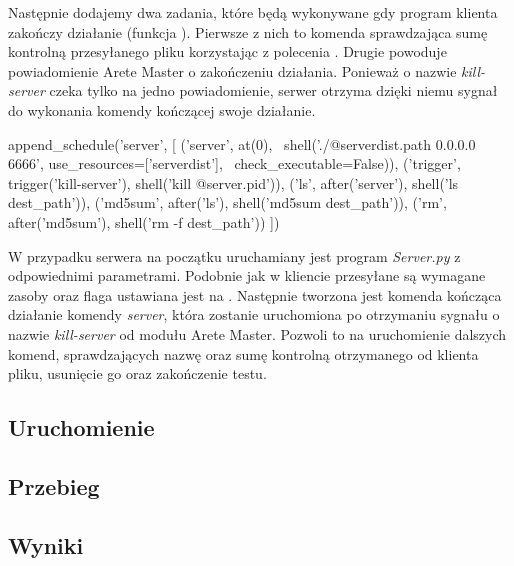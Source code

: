 \documentclass[00-praca-magisterska.tex]{subfiles}
\begin{document}
Następnie dodajemy dwa zadania, które będą wykonywane gdy program klienta zakończy
działanie (funkcja ). Pierwsze z nich to komenda sprawdzająca sumę
kontrolną przesyłanego pliku korzystając z polecenia . Drugie
powoduje powiadomienie Arete Master o zakończeniu działania. Ponieważ
 o nazwie \emph{kill-server} czeka tylko na jedno powiadomienie,
serwer otrzyma dzięki niemu sygnał do wykonania komendy kończącej swoje
działanie.

\begin{pythoncode}
  append_schedule('server', [
      ('server', at(0), \
          shell('./@{serverdist.path} 0.0.0.0 6666', use_resources=['serverdist'], \
	  check_executable=False)),
      ('trigger', trigger('kill-server'), shell('kill @{server.pid}')),
      ('ls', after('server'), shell('ls dest_path')),
      ('md5sum', after('ls'), shell('md5sum dest_path')),
      ('rm', after('md5sum'), shell('rm -f dest_path'))
  ])
\end{pythoncode}

W przypadku serwera na początku uruchamiany jest program \emph{Server.py} z
odpowiednimi parametrami. Podobnie jak w kliencie przesyłane są wymagane zasoby
oraz flaga \code{check\_executable} ustawiana jest na \code{False}. Następnie
tworzona jest komenda kończąca działanie komendy \emph{server}, która zostanie
uruchomiona po otrzymaniu sygnału o nazwie \emph{kill-server} od modułu Arete
Master. Pozwoli to na uruchomienie dalszych komend, sprawdzających nazwę oraz
sumę kontrolną otrzymanego od klienta pliku, usunięcie go oraz zakończenie
testu.

\subsection{Uruchomienie}


\subsection{Przebieg}


\subsection{Wyniki}
\end{document}
